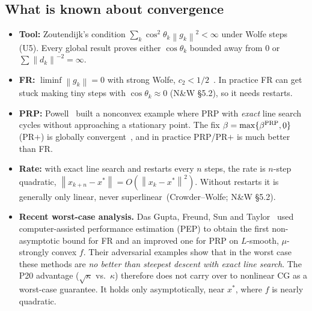 \documentclass[11pt,a4paper]{article}
\theoremstyle{remark}
\newcommand{\norm}[1]{\left\lVert #1\right\rVert}
\begin{document}
\subsection{What is known about convergence}
\begin{itemize}[leftmargin=1.5em]
\item \textbf{Tool:} Zoutendijk's condition $\sum_k\cos^2\theta_k\norm{g_k}^2<\infty$ under Wolfe steps (U5). Every global result proves either $\cos\theta_k$ bounded away from $0$ or $\sum\norm{d_k}^{-2}=\infty$.
\item \textbf{FR:} $\liminf\norm{g_k}=0$ with strong Wolfe, $c_2<1/2$~\cite{AlBaali1985}. In practice FR can get stuck making tiny steps with $\cos\theta_k\approx0$ (N\&W §5.2), so it needs restarts.
\item \textbf{PRP:} Powell~\cite{Powell1984} built a nonconvex example where PRP with \emph{exact} line search cycles without approaching a stationary point. The fix $\beta=\max\{\beta^{\rm PRP},0\}$ (PR$+$) is globally convergent~\cite{GilbertNocedal1992}, and in practice PRP/PR$+$ is much better than FR.
\item \textbf{Rate:} with exact line search and restarts every $n$ steps, the rate is $n$-step quadratic, $\norm{x_{k+n}-x^*}=O(\norm{x_k-x^*}^2)$. Without restarts it is generally only linear, never superlinear~(Crowder--Wolfe; N\&W §5.2).
\item \textbf{Recent worst-case analysis.} Das Gupta, Freund, Sun and Taylor~\cite{DasGuptaEtAl2025} used computer-assisted performance estimation (PEP) to obtain the first non-asymptotic bound for FR and an improved one for PRP on $L$-smooth, $\mu$-strongly convex $f$. Their adversarial examples show that in the worst case these methods are \emph{no better than steepest descent with exact line search}. The P20 advantage ($\sqrt\kappa$ vs.\ $\kappa$) therefore does not carry over to nonlinear CG as a worst-case guarantee. It holds only asymptotically, near $x^*$, where $f$ is nearly quadratic.
\end{itemize}
\end{document}

